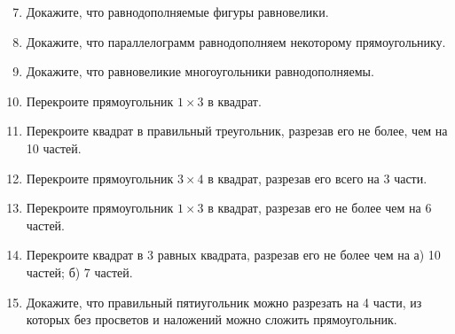 \documentclass{article}
\begin{document}
    \begin{enumerate}[label*=\protect\fbox{\arabic{enumi}}]

        \setcounter{enumi}{6}
        \item Докажите, что равнодополняемые фигуры равновелики.

        \item Докажите, что параллелограмм равнодополняем некоторому прямоугольнику.

        \item Докажите, что равновеликие многоугольники равнодополняемы.

        \item Перекроите прямоугольник $1 \times 3$ в квадрат.

        \item Перекроите квадрат в правильный треугольник, разрезав его не более, чем на 10 частей.

        \item Перекроите прямоугольник $3\times 4$ в квадрат, разрезав его всего на 3 части.

        \item Перекроите прямоугольник $1 \times 3$ в квадрат, разрезав его не более чем на 6 частей.

        \item Перекроите квадрат в 3 равных квадрата, разрезав его не более чем на а) 10 частей; б) 7 частей.

        \item Докажите, что правильный пятиугольник можно разрезать на 4 части, из которых без просветов и наложений можно сложить прямоугольник.

    \end{enumerate}
\end{document}
